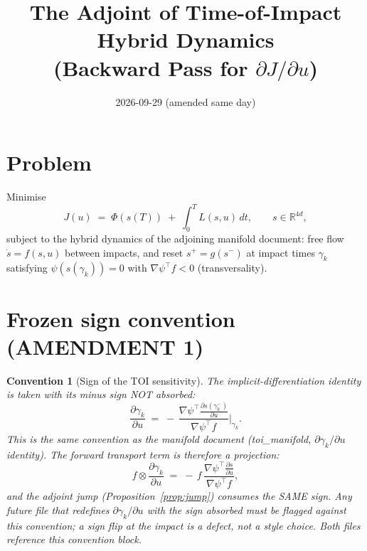 \documentclass[11pt]{article}
\title{The Adjoint of Time-of-Impact Hybrid Dynamics\\
      (Backward Pass for $\partial J/\partial u$)}
\date{2026-09-29 (amended same day)}
\newtheorem{convention}{Convention}
\begin{document}
\maketitle

\section{Problem}
Minimise
\begin{equation}
  J(u) \;=\; \Phi(s(T)) \;+\; \int_0^T \! L(s,u)\,dt,
  \qquad s \in \mathbb{R}^{4d},
\end{equation}
subject to the hybrid dynamics of the adjoining manifold document:
free flow $\dot s = f(s,u)$ between impacts, and reset
$s^+ = g(s^-)$ at impact times $\gamma_k$ satisfying
$\psi(s(\gamma_k)) = 0$ with $\nabla\psi^\top f < 0$ (transversality).

\section{Frozen sign convention (AMENDMENT 1)}
\begin{convention}[Sign of the TOI sensitivity]
\label{conv:sign}
The implicit-differentiation identity is taken with its minus sign
NOT absorbed:
\begin{equation}
  \frac{\partial\gamma_k}{\partial u}
  \;=\;
  -\,\frac{\nabla\psi^\top \tfrac{\partial s(\gamma_k^-)}{\partial u}}
          {\nabla\psi^\top f}\Big|_{\gamma_k}.
\end{equation}
This is the same convention as the manifold document (toi_manifold,
$\partial\gamma_k/\partial u$ identity). The forward transport term
is therefore a projection:
\begin{equation}
  f \otimes \frac{\partial\gamma_k}{\partial u}
  \;=\;
  -\,f\,\frac{\nabla\psi^\top \tfrac{\partial s}{\partial u}}
             {\nabla\psi^\top f},
\end{equation}
and the adjoint jump (Proposition~\ref{prop:jump}) consumes the SAME
sign. Any future file that redefines $\partial\gamma_k/\partial u$
with the sign absorbed must be flagged against this convention; a
sign flip at the impact is a defect, not a style choice. Both files
reference this convention block.
\end{convention}
\end{document}
